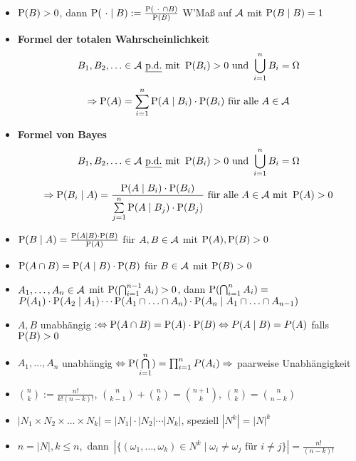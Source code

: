 \begin{itemize}
\item $\P(B)>0$, dann $\P(\ \cdot\mid B) := \frac{\P(\ \cdot\ \cap B)}{\P(B)}$
W'Maß auf $\A$ mit $\P(B\mid B)=1$

\item \textbf{Formel der totalen Wahrscheinlichkeit}
\[
	B_1, B_2,\ldots \in\A \text{ \underline{p.d.} mit } \P(B_i)>0 \text{ und } 
	\bigcup_{i=1}^{n} B_i = \Omega
\]
\[
	\Rightarrow \P(A)=\sum_{i=1}^{n} \P(A\mid B_i)\cdot\P(B_i)
	\text{ für alle } A\in\A
\]

\item \textbf{Formel von Bayes}
\[
	B_1, B_2,\ldots \in\A \text{ \underline{p.d.} mit } \P(B_i)>0 \text{ und }  
	\bigcup_{i=1}^{n} B_i = \Omega
\]
\[
	\Rightarrow\P(B_i\mid A)=
	\frac{\P(A\mid B_i)\cdot\P(B_i)}{\sum\limits_{j=1}^{n} \P(A\mid B_j)\cdot\P(B_j)}\ 
	\text{für alle } A\in\A \text{ mit } \P(A)>0
\]

\item $\P(B\mid A)=\frac{\P(A\mid B)\cdot\P(B)}{\P(A)}$ für $A,B\in\A$ mit
$\P(A),\P(B)>0$

\item $\P(A\cap B)=\P(A\mid B)\cdot\P(B)$ für $B\in\A$ mit $\P(B)>0$

\item $A_1,\ldots ,A_n\in\A$ mit $\P(\bigcap_{i=1}^{n-1} A_i)>0$, dann $\P(\bigcap_{i=1}^{n} A_i)=$\\ 
$P(A_1)\cdot\P(A_2\mid A_1)\cdots
\P(A_1\cap\ldots\cap A_n)\cdot\P(A_n\mid A_1\cap\ldots\cap A_{n-1})$

\item $A,B$ unabhängig $:\Leftrightarrow \P(A\cap B)=\P(A)\cdot\P(B)
\Leftrightarrow P(A\mid B) = P(A)$ falls $\P(B)>0$

\item $A_1,\ldots ,A_n$ unabhängig 
$\Leftrightarrow\P(\bigcap\limits_{i=1}^{n})=\prod_{i=1}^{n} P(A_i)
\Rightarrow$ paarweise Unabhängigkeit

\item $\binom{n}{k}:= \frac{n!}{k!(n-k)!}$, 
$\binom{n}{k-1}+\binom{n}{k}=\binom{n+1}{k}$,
$\binom{n}{k}=\binom{n}{n-k}$

\item $ |N_1 \times N_2 \times\dots\times N_k| = |N_1| \cdot |N_2| \cdots |N_k|$,
speziell $|N^k| = {|N|}^k$

\item \mbox{$n=|N|,k\leq n$, dann $|\{(\omega_1,\ldots,\omega_k)\in N^k 
\mid\omega_i\neq\omega_j\text { für }i\neq j\}|=\frac{n!}{(n-k)!}$}


\end{itemize}
